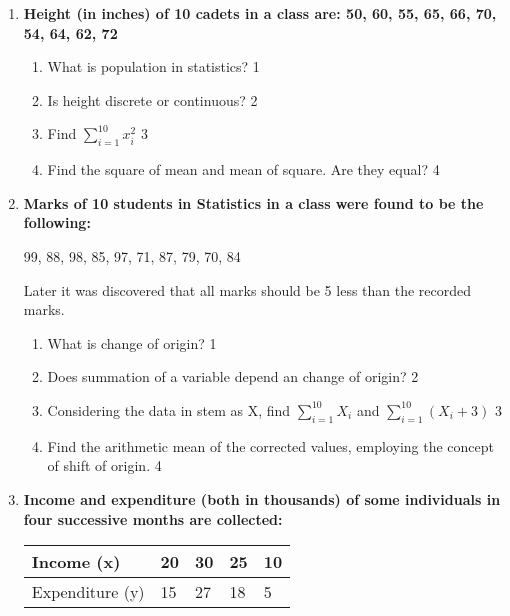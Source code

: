 \documentclass[a4paper,oneside]{book}
\begin{document}
\begin{enumerate}
 \item
	  \textbf{Height (in inches) of 10 cadets in a class are: 50, 60, 55, 65, 66, 70, 54, 64, 62, 72} 
	 
  \begin{enumerate}
    \item
	What is population in statistics? \hfill 1
    \item
	Is height discrete or continuous? \hfill 2
    \item  
	Find $\displaystyle \sum_{i=1}^{10} x_i^2$ \hfill 3
    \item
	Find the square of mean and mean of square. Are they equal? \hfill 4
  \end{enumerate}
  
   \item
	  \textbf{Marks of 10 students in Statistics in a class were found to be the following:} 
	 
	 \begin{center} 
	  99, 88, 98, 85, 97, 71, 87, 79, 70, 84
	  
	  \end{center}
	  
	  Later it was discovered that all marks should be 5 less than the recorded marks. 
  
  \begin{enumerate}
    \item
	What is change of origin? \hfill 1
    \item
	Does summation of a variable depend an change of origin?  \hfill 2
    \item  
	Considering the data in stem as X, find $\displaystyle \sum_{i=1}^{10} X_i$ and $\displaystyle \sum_{i=1}^{10} (X_i+3)$ \hfill 3
    \item
	Find the arithmetic mean of the corrected values, employing the concept of shift of origin. \hfill 4
  \end{enumerate}

  \item
  \textbf{Income and expenditure (both in thousands) of some individuals in four successive months are collected:}
 
\begin{table}[h]
 \begin{center}
\begin{tabular}{l|l|l|l|l}

Income (x)  & 20 & 30 & 25 & 10 \\ \hline
Expenditure (y) & 15  & 27  & 18 & 5 \\ 
\end{tabular}
\end{center}
\end{table}



\end{enumerate}
\end{document}
